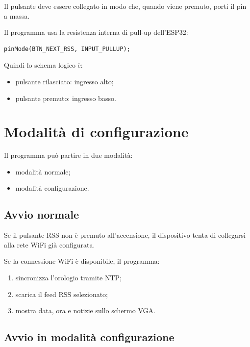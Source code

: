 \documentclass[11pt,a4paper]{article}
\begin{document}
	Il pulsante deve essere collegato in modo che, quando viene premuto, porti il pin a massa.
	
	Il programma usa la resistenza interna di pull-up dell'ESP32:
	
	\begin{lstlisting}[style=codice]
		pinMode(BTN_NEXT_RSS, INPUT_PULLUP);
	\end{lstlisting}
	
	Quindi lo schema logico è:
	
	\begin{itemize}
		\item pulsante rilasciato: ingresso alto;
		\item pulsante premuto: ingresso basso.
	\end{itemize}
	
	\section{Modalità di configurazione}
	
	Il programma può partire in due modalità:
	
	\begin{itemize}
		\item modalità normale;
		\item modalità configurazione.
	\end{itemize}
	
	\subsection{Avvio normale}
	
	Se il pulsante RSS non è premuto all'accensione, il dispositivo tenta di collegarsi alla rete WiFi già configurata.
	
	Se la connessione WiFi è disponibile, il programma:
	
	\begin{enumerate}
		\item sincronizza l'orologio tramite NTP;
		\item scarica il feed RSS selezionato;
		\item mostra data, ora e notizie sullo schermo VGA.
	\end{enumerate}
	
	\subsection{Avvio in modalità configurazione}
	
\end{document}
